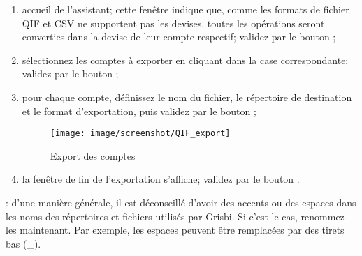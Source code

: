 \begin{enumerate}
	\item accueil de l'assistant; cette fenêtre indique que, comme les formats de fichier QIF et CSV ne supportent pas les devises, toutes les opérations seront converties dans la devise de leur compte respectif; validez par le bouton ;
	\item sélectionnez les comptes à exporter en cliquant dans la case correspondante; validez par le bouton ;
	\item pour chaque compte, définissez le nom du fichier, le répertoire de destination et le format d'exportation, puis validez par le bouton  ;
	\begin{figure}[t]
	\begin{center}
	\texttt{[image: image/screenshot/QIF\_export]}
	\end{center}
	\caption{Export des comptes}
	\label{QIF-export-img}
	\end{figure}
	
	\item la fenêtre de fin de l'exportation s'affiche; validez par le bouton .
\end{enumerate}

\Attention{}: d'une manière générale, il est déconseillé d'avoir des accents ou des espaces dans les noms des répertoires et fichiers utilisés par Grisbi. Si c'est le cas, renommez-les maintenant. Par exemple, les espaces peuvent être remplacées par des tirets bas (\_).











